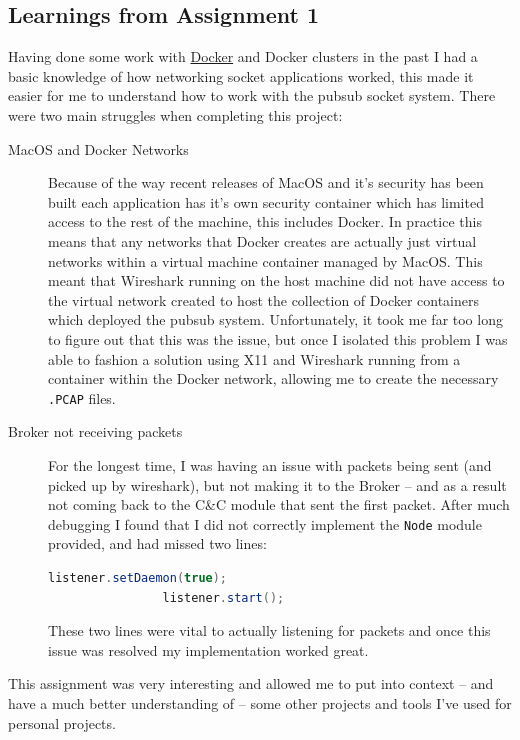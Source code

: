 \documentclass{article}
\newcommand{\code}[1]{\colorbox{light-gray}{\texttt{#1}}}
\begin{document}
    \subsection{Learnings from Assignment 1}
    Having done some work with \hyperlink{https://www.docker.com/}{Docker} and Docker clusters in the past I had a basic knowledge of how networking socket applications worked, this made it easier for me to understand how to work with the pubsub socket system. There were two main struggles when completing this project: 
    \begin{description}
        \item[MacOS and Docker Networks] Because of the way recent releases of MacOS and it's security has been built each application has it's own security container which has limited access to the rest of the machine, this includes Docker. In practice this means that any networks that Docker creates are actually just virtual networks within a virtual machine container managed by MacOS. This meant that Wireshark running on the host machine did not have access to the virtual network created to host the collection of Docker containers which deployed the pubsub system. Unfortunately, it took me far too long to figure out that this was the issue, but once I isolated this problem I was able to fashion a solution using X11 and Wireshark running from a container within the Docker network, allowing me to create the necessary \code{.PCAP} files. 
        \item[Broker not receiving packets] For the longest time, I was having an issue with packets being sent (and picked up by wireshark), but not making it to the Broker -- and as a result not coming back to the C\&C module that sent the first packet. After much debugging I found that I did not correctly implement the \code{Node} module provided, and had missed two lines:
            \begin{lstlisting}[language=java]
                listener.setDaemon(true);
                listener.start();
            \end{lstlisting}
            These two lines were vital to actually listening for packets and once this issue was resolved my implementation worked great.
    \end{description}
    This assignment was very interesting and allowed me to put into context -- and have a much better understanding of -- some other projects and tools I've used for personal projects.
    
\end{document}
